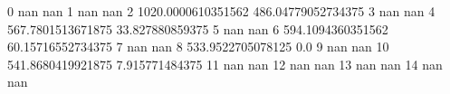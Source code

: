 0 nan nan
1 nan nan
2 1020.0000610351562 486.04779052734375
3 nan nan
4 567.7801513671875 33.827880859375
5 nan nan
6 594.1094360351562 60.15716552734375
7 nan nan
8 533.9522705078125 0.0
9 nan nan
10 541.8680419921875 7.915771484375
11 nan nan
12 nan nan
13 nan nan
14 nan nan
